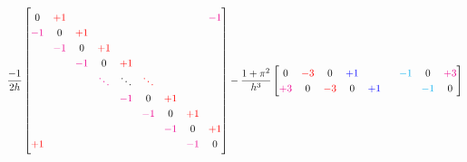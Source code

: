\begin{equation*}
\renewcommand{\arraystretch}{1.25} %
\renewcommand{\arraycolsep}{4.5pt} %
\frac{-1}{2 h}
\begin{bmatrix}
0           & \ca +1   &             &             &             &             &             &             & \cb -1      \\
\cb -1      & 0        & \ca +1      &             &             &             &             &             &             \\
            & \cb -1   & 0           & \ca +1      &             &             &             &             &             \\
            &          & \cb -1      & 0           & \ca +1      &             &             &             &             \\
            &          &             & \cb \ddots  & \ddots      & \ca \ddots  &             &             &             \\
            &          &             &             & \cb -1      & 0           & \ca +1      &             &             \\
            &          &             &             &             & \cb -1      & 0           & \ca +1      &             \\
            &          &             &             &             &             & \cb -1      & 0           & \ca +1      \\
\ca +1      &          &             &             &             &             &             & \cb -1      & 0           \\
\end{bmatrix}
-\frac{1+\pi^2}{h^3}
\begin{bmatrix}
0           & \ca -3      & 0           & \cc +1      &             &             & \cd -1      & 0           & \cb +3      \\
\cb +3      & 0           & \ca -3      & 0           & \cc +1      &             &             & \cd -1      & 0           \\

\end{bmatrix}
\end{equation*}
